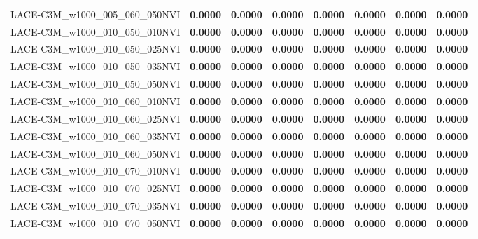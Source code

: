 \begin{table}
\begin{tabular}{lrrrrrrr}
LACE-C3M\_w1000\_005\_060\_050NVI & \textbf{0.0000} & \textbf{0.0000} & \textbf{0.0000} & \textbf{0.0000} & \textbf{0.0000} & \textbf{0.0000} & \textbf{0.0000} \\
LACE-C3M\_w1000\_010\_050\_010NVI & \textbf{0.0000} & \textbf{0.0000} & \textbf{0.0000} & \textbf{0.0000} & \textbf{0.0000} & \textbf{0.0000} & \textbf{0.0000} \\
LACE-C3M\_w1000\_010\_050\_025NVI & \textbf{0.0000} & \textbf{0.0000} & \textbf{0.0000} & \textbf{0.0000} & \textbf{0.0000} & \textbf{0.0000} & \textbf{0.0000} \\
LACE-C3M\_w1000\_010\_050\_035NVI & \textbf{0.0000} & \textbf{0.0000} & \textbf{0.0000} & \textbf{0.0000} & \textbf{0.0000} & \textbf{0.0000} & \textbf{0.0000} \\
LACE-C3M\_w1000\_010\_050\_050NVI & \textbf{0.0000} & \textbf{0.0000} & \textbf{0.0000} & \textbf{0.0000} & \textbf{0.0000} & \textbf{0.0000} & \textbf{0.0000} \\
LACE-C3M\_w1000\_010\_060\_010NVI & \textbf{0.0000} & \textbf{0.0000} & \textbf{0.0000} & \textbf{0.0000} & \textbf{0.0000} & \textbf{0.0000} & \textbf{0.0000} \\
LACE-C3M\_w1000\_010\_060\_025NVI & \textbf{0.0000} & \textbf{0.0000} & \textbf{0.0000} & \textbf{0.0000} & \textbf{0.0000} & \textbf{0.0000} & \textbf{0.0000} \\
LACE-C3M\_w1000\_010\_060\_035NVI & \textbf{0.0000} & \textbf{0.0000} & \textbf{0.0000} & \textbf{0.0000} & \textbf{0.0000} & \textbf{0.0000} & \textbf{0.0000} \\
LACE-C3M\_w1000\_010\_060\_050NVI & \textbf{0.0000} & \textbf{0.0000} & \textbf{0.0000} & \textbf{0.0000} & \textbf{0.0000} & \textbf{0.0000} & \textbf{0.0000} \\
LACE-C3M\_w1000\_010\_070\_010NVI & \textbf{0.0000} & \textbf{0.0000} & \textbf{0.0000} & \textbf{0.0000} & \textbf{0.0000} & \textbf{0.0000} & \textbf{0.0000} \\
LACE-C3M\_w1000\_010\_070\_025NVI & \textbf{0.0000} & \textbf{0.0000} & \textbf{0.0000} & \textbf{0.0000} & \textbf{0.0000} & \textbf{0.0000} & \textbf{0.0000} \\
LACE-C3M\_w1000\_010\_070\_035NVI & \textbf{0.0000} & \textbf{0.0000} & \textbf{0.0000} & \textbf{0.0000} & \textbf{0.0000} & \textbf{0.0000} & \textbf{0.0000} \\
LACE-C3M\_w1000\_010\_070\_050NVI & \textbf{0.0000} & \textbf{0.0000} & \textbf{0.0000} & \textbf{0.0000} & \textbf{0.0000} & \textbf{0.0000} & \textbf{0.0000} \\

\end{tabular}
\end{table}
